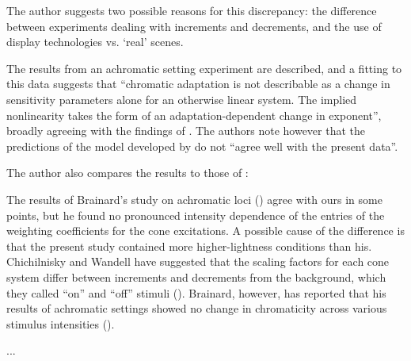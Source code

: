 The author suggests two possible reasons for this discrepancy: the difference between experiments dealing with increments and decrements, and the use of display technologies vs. `real' scenes.

The results from an achromatic setting experiment are described, and a fitting to this data suggests that ``chromatic adaptation is not describable as a change in sensitivity parameters alone for an otherwise linear system. The implied nonlinearity takes the form of an adaptation-dependent change in exponent'', broadly agreeing with the findings of \citet{walraven_chromatic_1982}. The authors note however that the predictions of the model developed by \citet{walraven_chromatic_1982} do not ``agree well with the present data''.

The author also compares the results to those of \citet{brainard_color_1998}:

\begin{itquote}{}
The results of Brainard’s study on achromatic loci (\citet{brainard_color_1998}) agree with ours in some points, but he found
no pronounced intensity dependence of the entries of the
weighting coefficients for the cone excitations. A possible
cause of the difference is that the present study contained
more higher-lightness conditions than his. Chichilnisky
and Wandell have suggested that the scaling factors for
each cone system differ between increments and decrements
from the background, which they called ``on'' and ``off''
stimuli (\citet{chichilnisky_seeing_1996}). Brainard, however,
has reported that his results of achromatic settings showed
no change in chromaticity across various stimulus intensities
(\citet{brainard_color_1998}).
\end{itquote}

\textbf{\citet{weiss_determinants_2017}} ...




\clearpage









